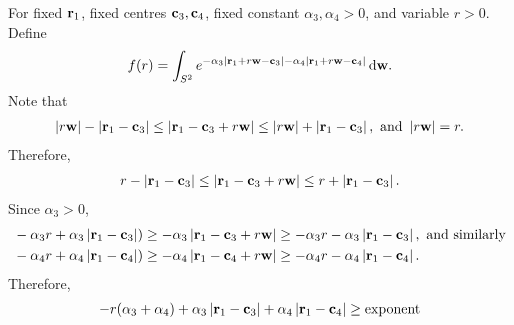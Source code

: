 \documentclass[12pt]{article}
\begin{document}
For fixed \(\vr_1\), fixed centres \(\vc_3, \vc_4\), fixed constant \(\alpha_3, \alpha_4 > 0\), and variable \(r > 0\).
Define
\begin{align*}
    f(r) = \int_{S^2} e^{-\alpha_3|\vr_1 + r\vw - \vc_3|-\alpha_4|\vr_1 + r\vw - \vc_4|} \diff \vw.
\end{align*}
Note that 
\begin{align*}
    \abs{r\vw} - \abs{\vr_1 - \vc_3}\leq \abs{\vr_1 - \vc_3 + r\vw} \leq \abs{r\vw} + \abs{\vr_1 - \vc_3}, \text{ and } \abs{r\vw} = r.
\end{align*}
Therefore,
\begin{align*}
    r - \abs{\vr_1 - \vc_3} \leq \abs{\vr_1 - \vc_3 + r\vw} \leq r + \abs{\vr_1 - \vc_3}.
\end{align*}
Since \(\alpha_3 > 0\),
\begin{align*}
    &-\alpha_3r + \alpha_3\abs{\vr_1 - \vc_3})  \geq -\alpha_3\abs{\vr_1 - \vc_3 + r\vw} \geq -\alpha_3r - \alpha_3 \abs{\vr_1 - \vc_3}, \text{ and similarly}\\
    &-\alpha_4r + \alpha_4\abs{\vr_1 - \vc_4})  \geq -\alpha_4\abs{\vr_1 - \vc_4 + r\vw} \geq -\alpha_4r - \alpha_4 \abs{\vr_1 - \vc_4}.
\end{align*}
Therefore,
\begin{align*}
    -r(\alpha_3 + \alpha_4) + \alpha_3 \abs{\vr_1 - \vc_3} + \alpha_4\abs{\vr_1 - \vc_4} \geq \text{exponent} 
\end{align*}
\end{document}
